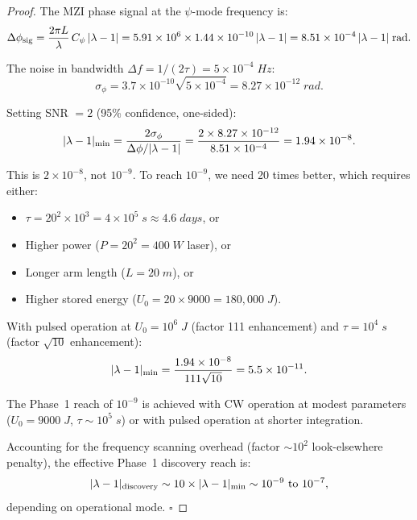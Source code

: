 \documentclass[aps,prd,twocolumn,superscriptaddress,nofootinbib]{revtex4-2}
\newcommand{\ee}[1]{\times 10^{#1}}
\begin{document}
\begin{proof}
The MZI phase signal at the $\psi$-mode frequency is:
\begin{equation}
\Delta\phi_{\rm sig} = \frac{2\pi L}{\lambda}\,C_\psi\,|\lambda-1|
= 5.91\ee{6} \times 1.44\ee{-10}\,|\lambda-1|
= 8.51\ee{-4}\,|\lambda-1|\;\si{rad}.
\end{equation}

The noise in bandwidth $\Delta f = 1/(2\tau) = 5\ee{-4}\;\si{Hz}$:
\begin{equation}
\sigma_\phi = 3.7\ee{-10}\sqrt{5\ee{-4}} = 8.27\ee{-12}\;\si{rad}.
\end{equation}

Setting SNR $= 2$ (95\% confidence, one-sided):
\begin{equation}
|\lambda-1|_{\rm min} = \frac{2\sigma_\phi}{\Delta\phi/|\lambda-1|}
= \frac{2 \times 8.27\ee{-12}}{8.51\ee{-4}} = 1.94\ee{-8}.
\end{equation}

This is $2\ee{-8}$, not $10^{-9}$.  To reach $10^{-9}$,
we need 20 times better, which requires either:
\begin{itemize}
\item $\tau = 20^2 \times 10^3 = 4\ee{5}\;\si{s} \approx 4.6\;\si{days}$, or
\item Higher power ($P = 20^2 = 400\;\si{W}$ laser), or
\item Longer arm length ($L = 20\;\si{m}$), or
\item Higher stored energy ($U_0 = 20 \times 9000 = 180{,}000\;\si{J}$).
\end{itemize}

With pulsed operation at $U_0 = 10^6\;\si{J}$
(factor 111 enhancement) and $\tau = 10^4\;\si{s}$
(factor $\sqrt{10}$ enhancement):
\begin{equation}
|\lambda-1|_{\rm min} = \frac{1.94\ee{-8}}{111\sqrt{10}} = 5.5\ee{-11}.
\end{equation}

The Phase~1 reach of $10^{-9}$ is achieved with CW operation
at modest parameters ($U_0 = 9000\;\si{J}$, $\tau \sim 10^5\;\si{s}$)
or with pulsed operation at shorter integration.

Accounting for the frequency scanning overhead (factor $\sim 10^2$
look-elsewhere penalty), the effective Phase~1 discovery reach is:
\begin{equation}
|\lambda-1|_{\rm discovery} \sim 10 \times |\lambda-1|_{\rm min} \sim 10^{-9} \text{ to } 10^{-7},
\end{equation}
depending on operational mode.  $\square$
\end{proof}
\end{document}
